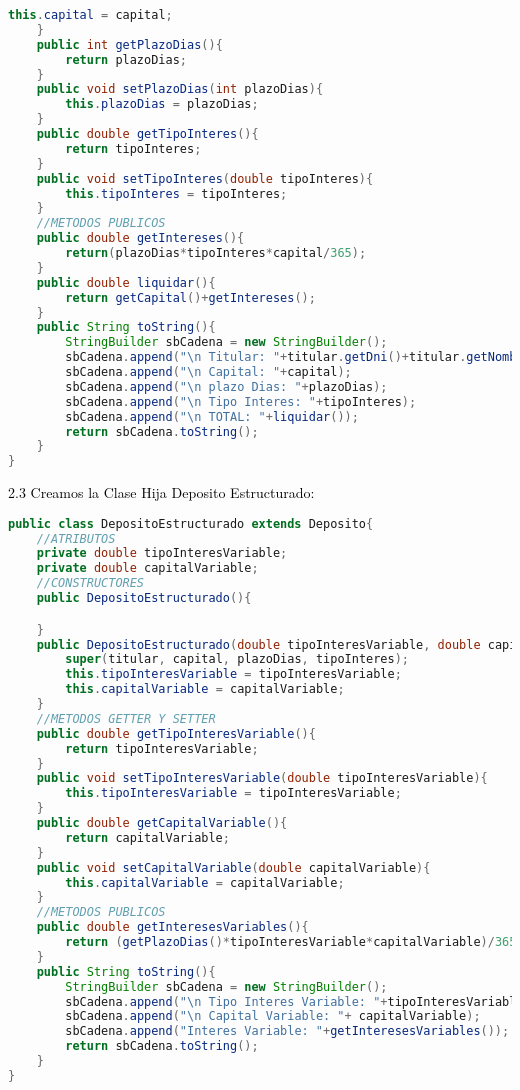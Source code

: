 \documentclass{article}
\begin{document}
\begin{itemize}
\begin{itemize}
\begin{lstlisting}[language=java]
        this.capital = capital;
    }
    public int getPlazoDias(){
        return plazoDias;
    }
    public void setPlazoDias(int plazoDias){
        this.plazoDias = plazoDias;
    }
    public double getTipoInteres(){
        return tipoInteres;
    }
    public void setTipoInteres(double tipoInteres){
        this.tipoInteres = tipoInteres;
    }
    //METODOS PUBLICOS
    public double getIntereses(){
        return(plazoDias*tipoInteres*capital/365);
    }
    public double liquidar(){
        return getCapital()+getIntereses();
    }
    public String toString(){
        StringBuilder sbCadena = new StringBuilder();
        sbCadena.append("\n Titular: "+titular.getDni()+titular.getNombre());
        sbCadena.append("\n Capital: "+capital);
        sbCadena.append("\n plazo Dias: "+plazoDias);
        sbCadena.append("\n Tipo Interes: "+tipoInteres);
        sbCadena.append("\n TOTAL: "+liquidar());
        return sbCadena.toString();
    }
}

        \end{lstlisting}
        \textcolor{black}{2.3 Creamos la Clase Hija Deposito Estructurado:}
        \begin{lstlisting}[language=java]
public class DepositoEstructurado extends Deposito{
    //ATRIBUTOS
    private double tipoInteresVariable;
    private double capitalVariable;
    //CONSTRUCTORES
    public DepositoEstructurado(){

    }
    public DepositoEstructurado(double tipoInteresVariable, double capitalVariable, Persona titular, double capital, int plazoDias, double tipoInteres){
        super(titular, capital, plazoDias, tipoInteres);
        this.tipoInteresVariable = tipoInteresVariable;
        this.capitalVariable = capitalVariable;
    }
    //METODOS GETTER Y SETTER
    public double getTipoInteresVariable(){
        return tipoInteresVariable;
    }
    public void setTipoInteresVariable(double tipoInteresVariable){
        this.tipoInteresVariable = tipoInteresVariable;
    }
    public double getCapitalVariable(){
        return capitalVariable;
    }
    public void setCapitalVariable(double capitalVariable){
        this.capitalVariable = capitalVariable;
    }
    //METODOS PUBLICOS
    public double getInteresesVariables(){
        return (getPlazoDias()*tipoInteresVariable*capitalVariable)/365;
    }
    public String toString(){
        StringBuilder sbCadena = new StringBuilder();
        sbCadena.append("\n Tipo Interes Variable: "+tipoInteresVariable);
        sbCadena.append("\n Capital Variable: "+ capitalVariable);
        sbCadena.append("Interes Variable: "+getInteresesVariables());
        return sbCadena.toString();
    }
}


\end{lstlisting}
\end{itemize}
\end{itemize}
\end{document}
